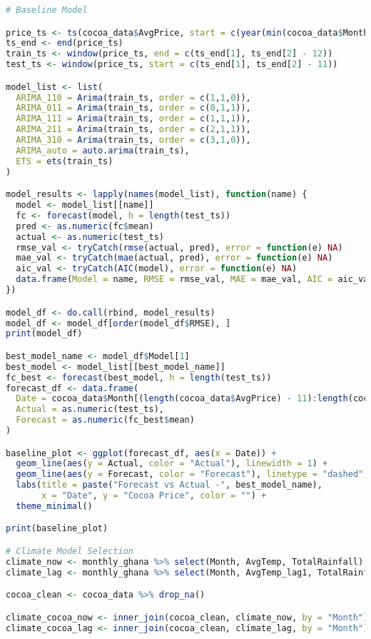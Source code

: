 \begin{lstlisting}[language=R]
# Baseline Model

price_ts <- ts(cocoa_data$AvgPrice, start = c(year(min(cocoa_data$Month)), month(min(cocoa_data$Month))), frequency = 12)
ts_end <- end(price_ts)
train_ts <- window(price_ts, end = c(ts_end[1], ts_end[2] - 12))
test_ts <- window(price_ts, start = c(ts_end[1], ts_end[2] - 11))

model_list <- list(
  ARIMA_110 = Arima(train_ts, order = c(1,1,0)),
  ARIMA_011 = Arima(train_ts, order = c(0,1,1)),
  ARIMA_111 = Arima(train_ts, order = c(1,1,1)),
  ARIMA_211 = Arima(train_ts, order = c(2,1,1)),
  ARIMA_310 = Arima(train_ts, order = c(3,1,0)),
  ARIMA_auto = auto.arima(train_ts),
  ETS = ets(train_ts)
)

model_results <- lapply(names(model_list), function(name) {
  model <- model_list[[name]]
  fc <- forecast(model, h = length(test_ts))
  pred <- as.numeric(fc$mean)
  actual <- as.numeric(test_ts)
  rmse_val <- tryCatch(rmse(actual, pred), error = function(e) NA)
  mae_val <- tryCatch(mae(actual, pred), error = function(e) NA)
  aic_val <- tryCatch(AIC(model), error = function(e) NA)
  data.frame(Model = name, RMSE = rmse_val, MAE = mae_val, AIC = aic_val)
})

model_df <- do.call(rbind, model_results)
model_df <- model_df[order(model_df$RMSE), ]
print(model_df)

best_model_name <- model_df$Model[1]
best_model <- model_list[[best_model_name]]
fc_best <- forecast(best_model, h = length(test_ts))
forecast_df <- data.frame(
  Date = cocoa_data$Month[(length(cocoa_data$AvgPrice) - 11):length(cocoa_data$AvgPrice)],
  Actual = as.numeric(test_ts),
  Forecast = as.numeric(fc_best$mean)
)

baseline_plot <- ggplot(forecast_df, aes(x = Date)) +
  geom_line(aes(y = Actual, color = "Actual"), linewidth = 1) +
  geom_line(aes(y = Forecast, color = "Forecast"), linetype = "dashed", linewidth = 1) +
  labs(title = paste("Forecast vs Actual -", best_model_name),
       x = "Date", y = "Cocoa Price", color = "") +
  theme_minimal()

print(baseline_plot)

# Climate Model Selection
climate_now <- monthly_ghana %>% select(Month, AvgTemp, TotalRainfall)
climate_lag <- monthly_ghana %>% select(Month, AvgTemp_lag1, TotalRainfall_lag1)

cocoa_clean <- cocoa_data %>% drop_na()

climate_cocoa_now <- inner_join(cocoa_clean, climate_now, by = "Month") %>% drop_na()
climate_cocoa_lag <- inner_join(cocoa_clean, climate_lag, by = "Month") %>% drop_na()


\end{lstlisting}
